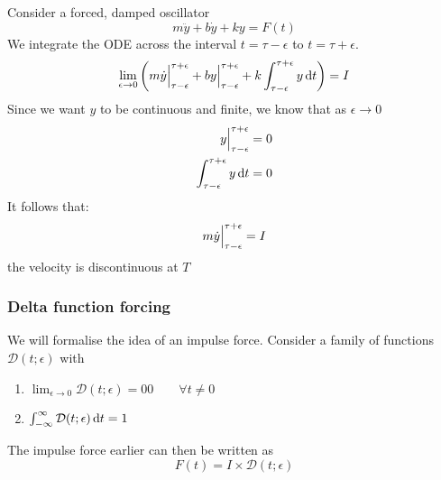 \documentclass{article}
\begin{document}
Consider a forced, damped oscillator
\[
    m \ddot{y} + b \dot{y} + ky = F(t)
\]
We integrate the ODE across the interval $t = \tau - \epsilon$ to $t = \tau + \epsilon$.
\[
    \lim_{\epsilon \rightarrow 0} \left(  m \dot{y} \Big{|}_{\tau - \epsilon}^{\tau + \epsilon} + b y\Big{|}_{\tau - \epsilon}^{\tau + \epsilon} + k \int_{\tau - \epsilon}^{\tau + \epsilon} y \mathop{}\!\mathrm{d} t  \right) = I    
\]
Since we want $y$ to be continuous and finite, we know that as $\epsilon \rightarrow 0$
\begin{align*}
    y\Big{|}_{\tau - \epsilon}^{\tau + \epsilon} = 0 \\
    \int_{\tau - \epsilon}^{\tau + \epsilon} y \mathop{}\!\mathrm{d} t = 0
\end{align*}
It follows that:
\[
    m \dot{y} \Big{|}_{\tau - \epsilon}^{\tau + \epsilon} = I
\]
the velocity is discontinuous at $T$
\subsubsection{Delta function forcing}
We will formalise the idea of an impulse force. Consider a family of functions $\mathcal{D}(t; \epsilon)$ with 
\begin{enumerate}[label=\arabic*.]
    \item $\lim_{\epsilon \rightarrow 0} \mathcal{D}(t; \epsilon) = 0 0 \qquad \forall t \neq 0$
    \item $\int_{-\infty}^{\infty}{\mathcal{D}(t; \epsilon) \mathop{}\!\mathrm{d} t} = 1$
\end{enumerate}
The impulse force earlier can then be written as
\[
    F(t) = I \times \mathcal{D}(t; \epsilon)  
\]
\end{document}
